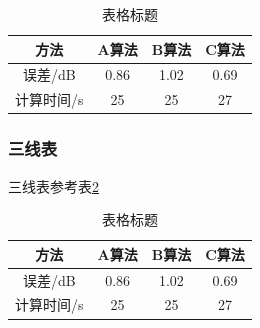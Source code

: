 \documentclass{nwputhesis}
\begin{document}
\begin{table}[H]
    \fontsize{10.5bp}{1.25}
    \caption{表格标题}
    \centering\label{table1}
    \begin{tabular}{|c|c|c|c|}
        \hline %
        方法       & A算法 & B算法 & C算法 \\ \hline
        误差/dB    & 0.86  & 1.02  & 0.69  \\ \hline
        计算时间/s & 25    & 25    & 27    \\ \hline
    \end{tabular}
\end{table}

\subsubsection{三线表}
三线表参考表\ref{table3}
\begin{table}[H]
    \fontsize{10.5bp}{1.25}
    \caption{表格标题}
    \centering\label{table3}
    \begin{tabular}{cccc}
        \toprule[1.5pt]
        方法       & A算法 & B算法 & C算法 \\
        \toprule[1.5pt]
        误差/dB    & 0.86  & 1.02  & 0.69  \\
        计算时间/s & 25    & 25    & 27    \\
        \toprule[1.5pt]
    \end{tabular}
\end{table}
\end{document}
